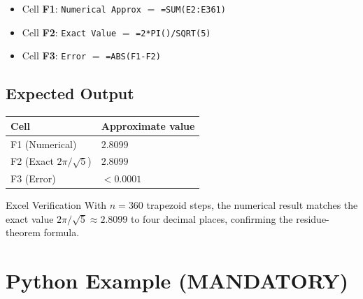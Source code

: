 \documentclass[12pt,a4paper]{article}
\begin{document}
\begin{itemize}
  \item Cell \textbf{F1}: \texttt{Numerical Approx} $=$ \texttt{=SUM(E2:E361)}
  \item Cell \textbf{F2}: \texttt{Exact Value} $=$ \texttt{=2*PI()/SQRT(5)}
  \item Cell \textbf{F3}: \texttt{Error} $=$ \texttt{=ABS(F1-F2)}
\end{itemize}

\subsection*{Expected Output}

\begin{center}
\begin{tabular}{@{}ll@{}}
\toprule
\textbf{Cell} & \textbf{Approximate value} \\
\midrule
F1 (Numerical) & $2.8099$ \\
F2 (Exact $2\pi/\sqrt{5}$) & $2.8099$ \\
F3 (Error) & $< 0.0001$ \\
\bottomrule
\end{tabular}
\end{center}

\begin{learnbox}{Excel Verification}
With $n = 360$ trapezoid steps, the numerical result matches the exact value
$2\pi/\sqrt{5} \approx 2.8099$ to four decimal places, confirming the
residue-theorem formula.
\end{learnbox}

\section{Python Example (MANDATORY)}
\end{document}
